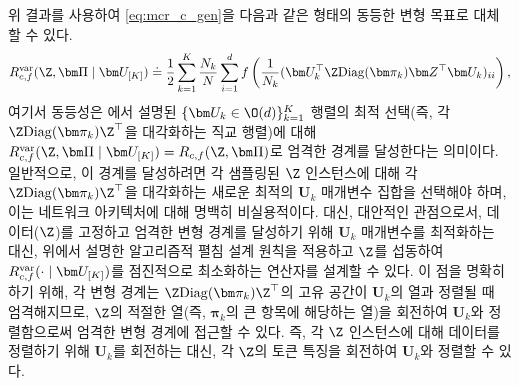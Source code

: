 \documentclass[../../book-main_ko.tex]{subfiles}
\begin{document}
위 결과를 사용하여 \eqref{eq:mcr_c_gen}을 다음과 같은 형태의 동등한 변형 목표로 대체할 수 있다.
\vspace{-2mm}
\begin{equation}
    \label{eq:var_comp}
    R^{\rm var}_{c,f} (\Z,\bm \Pi \mid \bm U_{[K]}) \doteq \frac{1}{2}\sum_{k=1}^K \frac{N_k}{N} \sum_{i=1}^{d} f\left(\frac{1}{N_k} (\bm U_{k}^{\top} \Z \mathrm{Diag}(\bm \pi_k) \bm Z^{\top} \bm U_{k})_{ii} \right),
\end{equation}
여기서 동등성은 에서 설명된 $\{ \bm U_k \in \O(d)\}_{k=1}^K$ 행렬의 최적 선택(즉, 각 $\Z \mathrm{Diag}(\bm \pi_k) \Z^\top$을 대각화하는 직교 행렬)에 대해 $ R^{\rm var}_{c,f} (\Z,\bm \Pi \mid \bm U_{[K]}) = R_{c,f} (\Z,\bm \Pi)$로 엄격한 경계를 달성한다는 의미이다. 일반적으로, 이 경계를 달성하려면 각 샘플링된 $\Z$ 인스턴스에 대해 각 $\Z\mathrm{Diag}(\bm \pi_{k})\Z^{\top}$을 대각화하는 새로운 최적의 $\bm U_{k}$ 매개변수 집합을 선택해야 하며, 이는 네트워크 아키텍처에 대해 명백히 비실용적이다.
대신, 대안적인 관점으로서, 데이터($\Z$)를 고정하고 엄격한 변형 경계를 달성하기 위해 $\bm U_k$ 매개변수를 최적화하는 대신, 위에서 설명한 알고리즘적 펼침 설계 원칙을 적용하고 $\Z$를 섭동하여 $R_{c, f}^{\rm var}(\cdot \mid \bm U_{[K]})$를 점진적으로 최소화하는 연산자를 설계할 수 있다. 이 점을 명확히 하기 위해, 각 변형 경계는 $\Z \mathrm{Diag}(\bm \pi_k) \Z^\top$의 고유 공간이 $\bm U_k$의 열과 정렬될 때 엄격해지므로, $\Z$의 적절한 열(즉, $\bm \pi_k$의 큰 항목에 해당하는 열)을 회전하여 $\bm U_k$와 정렬함으로써 엄격한 변형 경계에 접근할 수 있다. 즉, 각 $\Z$ 인스턴스에 대해 데이터를 정렬하기 위해 $\bm U_k$를 회전하는 대신, 각 $\Z$의 토큰 특징을 회전하여 $\bm U_k$와 정렬할 수 있다.
\end{document}
